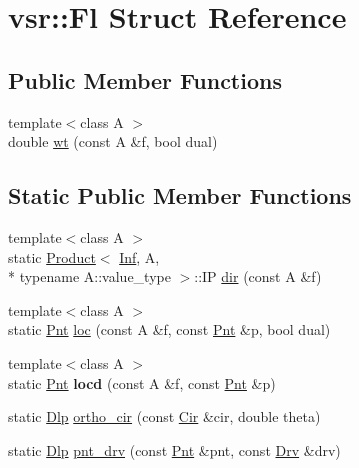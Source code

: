 \hypertarget{structvsr_1_1_fl}{\section{vsr\-:\-:Fl Struct Reference}
\label{structvsr_1_1_fl}
}
\subsection*{Public Member Functions}
\begin{DoxyCompactItemize}
\item 
{\footnotesize template$<$class A $>$ }\\double \hyperlink{structvsr_1_1_fl_a24f11685972476cb354c973d90f74b1a}{wt} (const A \&f, bool dual)
\end{DoxyCompactItemize}
\subsection*{Static Public Member Functions}
\begin{DoxyCompactItemize}
\item 
{\footnotesize template$<$class A $>$ }\\static \hyperlink{structvsr_1_1_product}{Product}$<$ \hyperlink{namespacevsr_ada8b0256ac30adae62e72c0309b72567}{Inf}, A, \\*
typename A\-::value\-\_\-type $>$\-::I\-P \hyperlink{structvsr_1_1_fl_abeb0be4b9bf07a0898838f8d15cc2312}{dir} (const A \&f)
\item 
{\footnotesize template$<$class A $>$ }\\static \hyperlink{namespacevsr_a2d05beb9721c5d9211b479af6d47222d}{Pnt} \hyperlink{structvsr_1_1_fl_a84fc2fd25a8fa6cd332d6bd33ac52039}{loc} (const A \&f, const \hyperlink{namespacevsr_a2d05beb9721c5d9211b479af6d47222d}{Pnt} \&p, bool dual)
\item 
\hypertarget{structvsr_1_1_fl_a9ab920ad317ec6cb129e493158691936}{{\footnotesize template$<$class A $>$ }\\static \hyperlink{namespacevsr_a2d05beb9721c5d9211b479af6d47222d}{Pnt} {\bfseries locd} (const A \&f, const \hyperlink{namespacevsr_a2d05beb9721c5d9211b479af6d47222d}{Pnt} \&p)}\label{structvsr_1_1_fl_a9ab920ad317ec6cb129e493158691936}

\item 
static \hyperlink{namespacevsr_ae6aa665e2777c681cdc7cab893be07d2}{Dlp} \hyperlink{structvsr_1_1_fl_a733cf63d12adf7453db80415d0b0305a}{ortho\-\_\-cir} (const \hyperlink{namespacevsr_a2744605aa828e495fc85463b7ae0d045}{Cir} \&cir, double theta)
\item 
static \hyperlink{namespacevsr_ae6aa665e2777c681cdc7cab893be07d2}{Dlp} \hyperlink{structvsr_1_1_fl_a9da27cbf01789fd8962837cf4286e45f}{pnt\-\_\-drv} (const \hyperlink{namespacevsr_a2d05beb9721c5d9211b479af6d47222d}{Pnt} \&pnt, const \hyperlink{namespacevsr_a106201b887e3d76e1fa4e2b719f1c9cc}{Drv} \&drv)
\end{DoxyCompactItemize}


